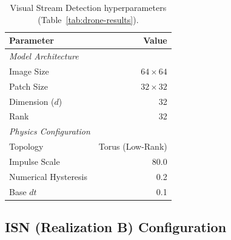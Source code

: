 \documentclass[12pt,a4paper]{article}
\begin{document}
\begin{table}[H]
    \centering
    \setlength{\tabcolsep}{10pt}
    \setlength{\extrarowheight}{3pt}
    \caption{Visual Stream Detection hyperparameters (Table~\ref{tab:drone-results}).}
    \label{tab:drone-config}
    \begin{tabular}{p{5.5cm}r}
        \toprule
        \textbf{Parameter} & \textbf{Value} \\
        \midrule
        \textit{Model Architecture} & \\
        \hspace{4pt}Image Size & $64 \times 64$ \\
        \hspace{4pt}Patch Size & $32 \times 32$ \\
        \hspace{4pt}Dimension ($d$) & 32 \\
        \hspace{4pt}Rank & 32 \\
        \midrule
        \textit{Physics Configuration} & \\
        \hspace{4pt}Topology & Torus (Low-Rank) \\
        \hspace{4pt}Impulse Scale & 80.0 \\
        \hspace{4pt}Numerical Hysteresis & 0.2 \\
        \hspace{4pt}Base $dt$ & 0.1 \\
        \bottomrule
    \end{tabular}
\end{table}

\subsection{ISN (Realization B) Configuration}
\end{document}
